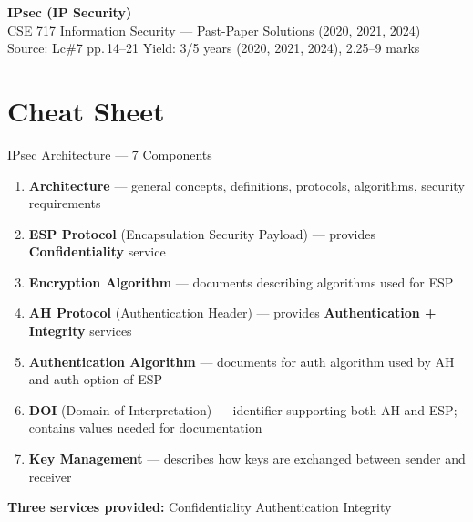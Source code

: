 \documentclass[12pt,a4paper]{article}
\begin{document}
\begin{center}
  {\LARGE\bfseries\color{folblue} IPsec (IP Security)}\\[4pt]
  {\large CSE 717 Information Security --- Past-Paper Solutions (2020, 2021, 2024)}\\[2pt]
  {\small Source: Lc\#7 pp.\,14--21 \quad Yield: 3/5 years (2020, 2021, 2024), 2.25--9 marks}
\end{center}
\vspace{0.5em}

\section{Cheat Sheet}

\begin{keybox}{IPsec Architecture --- 7 Components}
\begin{enumerate}[nosep,leftmargin=1.5em]
  \item \textbf{Architecture} --- general concepts, definitions, protocols, algorithms, security requirements
  \item \textbf{ESP Protocol} (Encapsulation Security Payload) --- provides \textbf{Confidentiality} service
  \item \textbf{Encryption Algorithm} --- documents describing algorithms used for ESP
  \item \textbf{AH Protocol} (Authentication Header) --- provides \textbf{Authentication + Integrity} services
  \item \textbf{Authentication Algorithm} --- documents for auth algorithm used by AH and auth option of ESP
  \item \textbf{DOI} (Domain of Interpretation) --- identifier supporting both AH and ESP; contains values needed for documentation
  \item \textbf{Key Management} --- describes how keys are exchanged between sender and receiver
\end{enumerate}

\medskip
\textbf{Three services provided:} Confidentiality \quad Authentication \quad Integrity
\end{keybox}

\vspace{0.5em}
\end{document}
